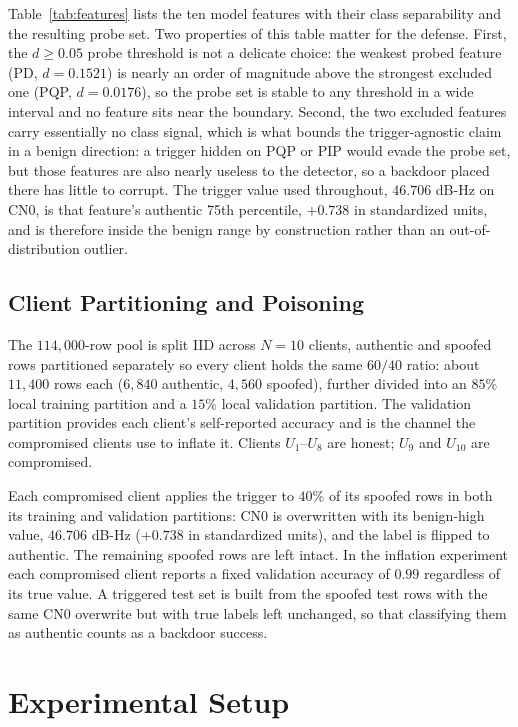 \documentclass[journal]{IEEEtran}
\begin{document}
Table~\ref{tab:features} lists the ten model features with their class separability and the resulting probe set. Two properties of this table matter for the defense. First, the $d \geq 0.05$ probe threshold is not a delicate choice: the weakest probed feature (PD, $d = 0.1521$) is nearly an order of magnitude above the strongest excluded one (PQP, $d = 0.0176$), so the probe set is stable to any threshold in a wide interval and no feature sits near the boundary. Second, the two excluded features carry essentially no class signal, which is what bounds the trigger-agnostic claim in a benign direction: a trigger hidden on PQP or PIP would evade the probe set, but those features are also nearly useless to the detector, so a backdoor placed there has little to corrupt. The trigger value used throughout, $46.706$ dB-Hz on CN0, is that feature's authentic 75th percentile, $+0.738$ in standardized units, and is therefore inside the benign range by construction rather than an out-of-distribution outlier.

\subsection{Client Partitioning and Poisoning}
The $114{,}000$-row pool is split IID across $N=10$ clients, authentic and spoofed rows partitioned separately so every client holds the same $60/40$ ratio: about $11{,}400$ rows each ($6{,}840$ authentic, $4{,}560$ spoofed), further divided into an $85\%$ local training partition and a $15\%$ local validation partition. The validation partition provides each client's self-reported accuracy and is the channel the compromised clients use to inflate it. Clients $U_1$--$U_8$ are honest; $U_9$ and $U_{10}$ are compromised.

Each compromised client applies the trigger to $40\%$ of its spoofed rows in both its training and validation partitions: CN0 is overwritten with its benign-high value, $46.706$ dB-Hz ($+0.738$ in standardized units), and the label is flipped to authentic. The remaining spoofed rows are left intact. In the inflation experiment each compromised client reports a fixed validation accuracy of $0.99$ regardless of its true value. A triggered test set is built from the spoofed test rows with the same CN0 overwrite but with true labels left unchanged, so that classifying them as authentic counts as a backdoor success.

\section{Experimental Setup}
\end{document}
